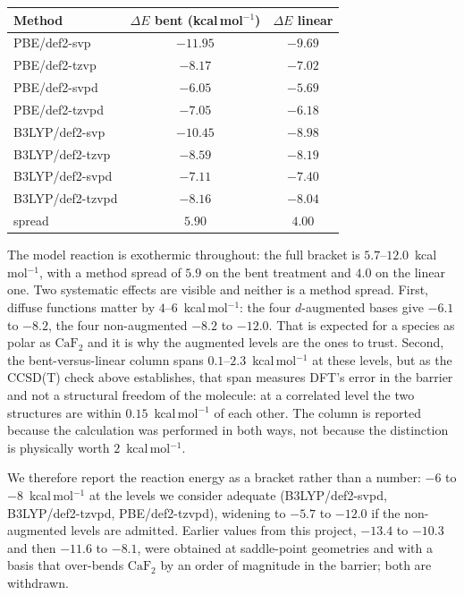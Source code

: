 \documentclass[11pt,a4paper]{article}
\theoremstyle{plain}
\theoremstyle{definition}
\theoremstyle{remark}
\begin{document}
\begin{center}
\begin{tabular}{lcc}
\hline
Method & $\Delta E$ bent (kcal\,mol$^{-1}$) & $\Delta E$ linear \\
\hline
PBE/def2-svp     & $-11.95$ & $-9.69$ \\
PBE/def2-tzvp    & $-8.17$  & $-7.02$ \\
PBE/def2-svpd    & $-6.05$  & $-5.69$ \\
PBE/def2-tzvpd   & $-7.05$  & $-6.18$ \\
B3LYP/def2-svp   & $-10.45$ & $-8.98$ \\
B3LYP/def2-tzvp  & $-8.59$  & $-8.19$ \\
B3LYP/def2-svpd  & $-7.11$  & $-7.40$ \\
B3LYP/def2-tzvpd & $-8.16$  & $-8.04$ \\
\hline
spread & $5.90$ & $4.00$ \\
\hline
\end{tabular}
\end{center}

The model reaction is exothermic throughout: the full bracket is
$5.7$--$12.0$~kcal\,mol$^{-1}$, with a method spread of $5.9$ on the bent treatment
and $4.0$ on the linear one. Two systematic effects are visible and neither is a
method spread. First, diffuse functions matter by $4$--$6$~kcal\,mol$^{-1}$: the
four $d$-augmented bases give $-6.1$ to $-8.2$, the four non-augmented $-8.2$ to
$-12.0$. That is expected for a species as polar as $\mathrm{CaF_2}$ and it is why
the augmented levels are the ones to trust. Second, the bent-versus-linear column spans
$0.1$--$2.3$~kcal\,mol$^{-1}$ at these levels, but as the CCSD(T) check above
establishes, that span measures DFT's error in the barrier and not a structural
freedom of the molecule: at a correlated level the two structures are within
$0.15$~kcal\,mol$^{-1}$ of each other. The column is reported because the
calculation was performed in both ways, not because the distinction is physically
worth $2$~kcal\,mol$^{-1}$.

We therefore report the reaction energy as a bracket rather than a number:
$-6$ to $-8$~kcal\,mol$^{-1}$ at the levels we consider adequate
(B3LYP/def2-svpd, B3LYP/def2-tzvpd, PBE/def2-tzvpd), widening to $-5.7$ to
$-12.0$ if the non-augmented levels are admitted. Earlier values from this project,
$-13.4$ to $-10.3$ and then $-11.6$ to $-8.1$, were obtained at saddle-point
geometries and with a basis that over-bends $\mathrm{CaF_2}$ by an order of
magnitude in the barrier; both are withdrawn.
\end{document}
